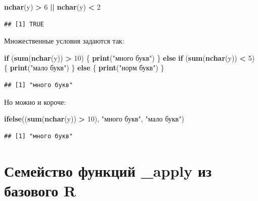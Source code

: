 \documentclass[
]{book}
\newenvironment{Shaded}{\begin{snugshade}}{\end{snugshade}}
\newcommand{\ControlFlowTok}[1]{\textcolor[rgb]{0.13,0.29,0.53}{\textbf{#1}}}
\newcommand{\DecValTok}[1]{\textcolor[rgb]{0.00,0.00,0.81}{#1}}
\newcommand{\FunctionTok}[1]{\textcolor[rgb]{0.13,0.29,0.53}{\textbf{#1}}}
\newcommand{\NormalTok}[1]{#1}
\newcommand{\SpecialCharTok}[1]{\textcolor[rgb]{0.81,0.36,0.00}{\textbf{#1}}}
\newcommand{\StringTok}[1]{\textcolor[rgb]{0.31,0.60,0.02}{#1}}
\theoremstyle{definition}
\theoremstyle{definition}
\theoremstyle{definition}
\theoremstyle{definition}
\theoremstyle{remark}
\begin{document}
\begin{Shaded}
\begin{Highlighting}[]
\FunctionTok{nchar}\NormalTok{(y) }\SpecialCharTok{\textgreater{}} \DecValTok{6} \SpecialCharTok{||} \FunctionTok{nchar}\NormalTok{(y) }\SpecialCharTok{\textless{}} \DecValTok{2} 
\end{Highlighting}
\end{Shaded}

\begin{verbatim}
## [1] TRUE
\end{verbatim}

Множественные условия задаются так:

\begin{Shaded}
\begin{Highlighting}[]
\ControlFlowTok{if}\NormalTok{ (}\FunctionTok{sum}\NormalTok{(}\FunctionTok{nchar}\NormalTok{(y)) }\SpecialCharTok{\textgreater{}} \DecValTok{10}\NormalTok{) \{}
  \FunctionTok{print}\NormalTok{(}\StringTok{"много букв"}\NormalTok{)}
\NormalTok{\} }\ControlFlowTok{else} \ControlFlowTok{if}\NormalTok{ (}\FunctionTok{sum}\NormalTok{(}\FunctionTok{nchar}\NormalTok{(y)) }\SpecialCharTok{\textless{}} \DecValTok{5}\NormalTok{) \{}
  \FunctionTok{print}\NormalTok{(}\StringTok{"мало букв"}\NormalTok{)}
\NormalTok{\} }\ControlFlowTok{else}\NormalTok{ \{}
  \FunctionTok{print}\NormalTok{(}\StringTok{"норм букв"}\NormalTok{)}
\NormalTok{\}}
\end{Highlighting}
\end{Shaded}

\begin{verbatim}
## [1] "много букв"
\end{verbatim}

Но можно и короче:

\begin{Shaded}
\begin{Highlighting}[]
\FunctionTok{ifelse}\NormalTok{((}\FunctionTok{sum}\NormalTok{(}\FunctionTok{nchar}\NormalTok{(y)) }\SpecialCharTok{\textgreater{}} \DecValTok{10}\NormalTok{), }\StringTok{"много букв"}\NormalTok{, }\StringTok{"мало букв"}\NormalTok{)}
\end{Highlighting}
\end{Shaded}

\begin{verbatim}
## [1] "много букв"
\end{verbatim}

\hypertarget{ux441ux435ux43cux435ux439ux441ux442ux432ux43e-ux444ux443ux43dux43aux446ux438ux439-_apply-ux438ux437-ux431ux430ux437ux43eux432ux43eux433ux43e-r}{%
\section{Семейство функций \_apply из базового R}\label{ux441ux435ux43cux435ux439ux441ux442ux432ux43e-ux444ux443ux43dux43aux446ux438ux439-_apply-ux438ux437-ux431ux430ux437ux43eux432ux43eux433ux43e-r}}
\end{document}
